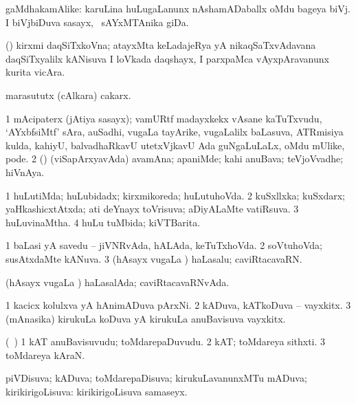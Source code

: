 {{{{{{\begin{center}
\bentry
{} 
\gl{\nA}
\expl{}
\bmng
gaMdhakamAlike: 
\banum
{} karuLina huLugaLanunx nAshamADaballx oMdu bageya biVj. 
 I biVjbiDuva sasayx, \kanmu\ sAYxMTAnika giDa. 
\eanum
\emng
\eentry

\bentry
{} 
\gl{\nA}
\expl{}
\bmng
(\hA) kirxmi daqSiTxkoVna; atayxMta keLadajeRya yA nikaqSaTxvAdavana daqSiTxyalilx kANisuva I loVkada daqshayx, I parxpaMca vAyxpAravanunx kurita vicAra. 
\emng
\eentry

\bentry
{} 
\gl{\nA}
\expl{}
\bmng
marasututx (cAlkara) cakarx. 
\emng
\eentry

\bentry
{} 
\gl{\nA}
\expl{}
\bmng
\bnum
\num{1} mAcipaterx (jAtiya sasayx); vamURtf madayxkekx vAsane kaTuTxvudu, `AYxbfsiMtf' sAra, auSadhi, \mo vugaLa tayArike, \mo vugaLalilx baLasuva, ATRmisiya kulda, kahiyU, balvadhaRkavU utetxVjkavU Ada guNgaLuLaLx, oMdu mUlike, pode. 
\num{2} (\rUpa) (viSapArxyavAda) avamAna; apaniMde; kahi anuBava; teVjoVvadhe; hiVnAya. 
\enum
\emng
\eentry

\bentry
{} 
\gl{\gu}
\bmng
\bnum
\num{1} huLutiMda; huLubidadx; kirxmikoreda; huLutuhoVda. 
\num{2} kuSxllxka; kuSxdarx; yaHkashicxtAtxda; ati deYnayx toVrisuva; aDiyALaMte vatiRsuva. 
\num{3} huLuvinaMtha. 
\num{4} huLu tuMbida; kiVTBarita. 
\enum
\emng
\eentry

\bentry
{} 
\gl{\gu}
\expl{}
\bmng
\bnum
\num{1} baLasi yA savedu -- jiVNRvAda, hALAda, keTuTxhoVda. 
\num{2} soVtuhoVda; susAtxdaMte kANuva. 
\num{3} (hAsayx \mo vugaLa \vi) haLasalu; caviRtacavaRN. 
\enum
\emng

\noindent
\gl{\pagu}
\expl{}
\bmng
{} (hAsayx \mo vugaLa \vi) haLasalAda; caviRtacavaRNvAda. 
\emng
\eentry

\bentry
{} 
\gl{\nA}
\expl{}
\bmng
\bnum
\num{1} kacicx kolulxva yA hAnimADuva pArxNi. 
\num{2} kADuva, kATkoDuva -- vayxkitx. 
\num{3} (mAnasika) kirukuLa koDuva yA kirukuLa anuBavisuva vayxkitx. 
\enum
\emng
\eentry

\bentry
{} 
\gl{\nA}
\expl{}
\bmng
(\kanmu\ \ame) 
\bnum
\num{1} kAT anuBavisuvudu; toMdarepaDuvudu. 
\num{2} kAT; toMdareya sithxti. 
\num{3} toMdareya kAraN. 
\enum
\emng
\eentry

\bentry
{} 
\gl{\gu}
\expl{}
\bmng
piVDisuva; kADuva; toMdarepaDisuva; kirukuLavanunxMTu mADuva; kirikirigoLisuva:  kirikirigoLisuva samaseyx. 
\emng
\eentry


\end{center}}}}}}}
